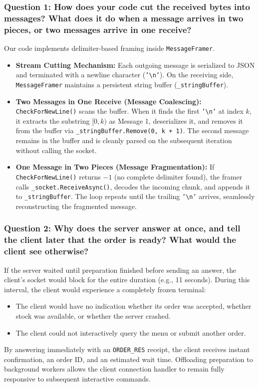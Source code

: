\documentclass[12pt,a4paper]{article}
\begin{document}
\subsubsection{Question 1: How does your code cut the received bytes into messages? What does it do when a message arrives in two pieces, or two messages arrive in one receive?}
Our code implements delimiter-based framing inside \texttt{MessageFramer}. 
\begin{itemize}
    \item \textbf{Stream Cutting Mechanism:} Each outgoing message is serialized to JSON and terminated with a newline character (\texttt{'\textbackslash n'}). On the receiving side, \texttt{MessageFramer} maintains a persistent string buffer (\texttt{\_stringBuffer}).
    \item \textbf{Two Messages in One Receive (Message Coalescing):} \texttt{CheckForNewLine()} scans the buffer. When it finds the first \texttt{'\textbackslash n'} at index $k$, it extracts the substring $[0, k)$ as Message 1, deserializes it, and removes it from the buffer via \texttt{\_stringBuffer.Remove(0, k + 1)}. The second message remains in the buffer and is cleanly parsed on the subsequent iteration without calling the socket.
    \item \textbf{One Message in Two Pieces (Message Fragmentation):} If \texttt{CheckForNewLine()} returns $-1$ (no complete delimiter found), the framer calls \texttt{\_socket.ReceiveAsync()}, decodes the incoming chunk, and appends it to \texttt{\_stringBuffer}. The loop repeats until the trailing \texttt{'\textbackslash n'} arrives, seamlessly reconstructing the fragmented message.
\end{itemize}

\subsubsection{Question 2: Why does the server answer at once, and tell the client later that the order is ready? What would the client see otherwise?}
If the server waited until preparation finished before sending an answer, the client's socket would block for the entire duration (e.g., 11 seconds). During this interval, the client would experience a completely frozen terminal:
\begin{itemize}
    \item The client would have no indication whether its order was accepted, whether stock was available, or whether the server crashed.
    \item The client could not interactively query the menu or submit another order.
\end{itemize}
By answering immediately with an \texttt{ORDER\_RES} receipt, the client receives instant confirmation, an order ID, and an estimated wait time. Offloading preparation to background workers allows the client connection handler to remain fully responsive to subsequent interactive commands.
\end{document}
